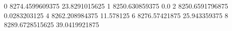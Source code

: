 0 8274.4599609375 23.8291015625
1 8250.630859375 0.0
2 8250.6591796875 0.0283203125
4 8262.208984375 11.578125
6 8276.57421875 25.943359375
8 8289.6728515625 39.0419921875
